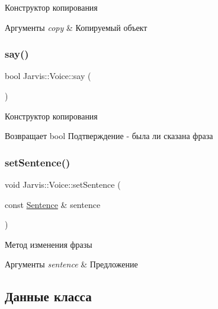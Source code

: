 Конструктор копирования 


\begin{DoxyParams}{Аргументы}
{\em copy} & Копируемый объект \\
\hline
\end{DoxyParams}
\mbox{\label{classJarvis_1_1Voice_ab86096f38092a5e0decd804588fb334c}} 
\subsubsection{\texorpdfstring{say()}{say()}}
{\footnotesize\ttfamily bool Jarvis\+::\+Voice\+::say (\begin{DoxyParamCaption}{ }\end{DoxyParamCaption})}



Конструктор копирования 

\begin{DoxyReturn}{Возвращает}
bool Подтверждение -\/ была ли сказана фраза 
\end{DoxyReturn}
\mbox{\label{classJarvis_1_1Voice_a3be7bee43cebb0e1ef50a24b399a6954}} 
\subsubsection{\texorpdfstring{set\+Sentence()}{setSentence()}}
{\footnotesize\ttfamily void Jarvis\+::\+Voice\+::set\+Sentence (\begin{DoxyParamCaption}\item[{const \hyperlink{classJarvis_1_1Sentence}{Sentence} \&}]{sentence }\end{DoxyParamCaption})}



Метод изменения фразы 


\begin{DoxyParams}{Аргументы}
{\em sentence} & Предложение \\
\hline
\end{DoxyParams}


\subsection{Данные класса}
\mbox{\label{classJarvis_1_1Voice_ac0a2f9e53d5b74b3ad7e84b0f203d4c4}} 
